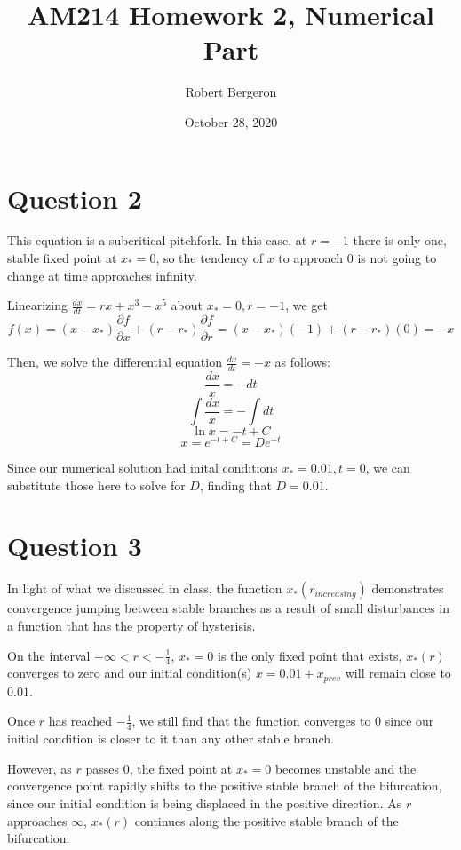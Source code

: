 \documentclass{article}
\title{AM214 Homework 2, Numerical Part}
\author{Robert Bergeron}
\date{October 28, 2020}
\begin{document}
\maketitle

\section*{Question 2}

This equation is a subcritical pitchfork. In this case, at \(r = -1\) there
is only one, stable fixed point at \(x_* = 0\), so the tendency of \(x\) to
approach \(0\) is not going to change at time approaches infinity.

Linearizing \(\frac{dx}{dt} = rx + x^3 - x^5\) about \(x_* = 0, r = -1\), we get
\[f(x) = (x - x_*)\frac{\partial f}{\partial x} + (r - r_*)\frac{\partial f}{\partial r}
= (x - x_*)(-1) + (r - r_*)(0) = -x\]

Then, we solve the differential equation \(\frac{dx}{dt} = -x\) as follows:
\[\frac{dx}{x} = -dt\]
\[\int \frac{dx}{x} = - \int dt\]
\[\ln x = -t + C\]
\[x = e^{-t + C} = De^{-t}\]

Since our numerical solution had inital conditions \(x_* = 0.01, t = 0\), we can
substitute those here to solve for \(D\), finding that \(D = 0.01\).

\section*{Question 3}
In light of what we discussed in class, the function \(x_*(r_{increasing})\)
demonstrates convergence jumping between stable branches as a result of small
disturbances in a function that has the property of hysterisis.

On the interval \(-\infty < r < -\frac{1}{4}\), \(x_* = 0\) is the only fixed point
that exists, \(x_*(r)\) converges to zero and our initial condition(s)
\(x = 0.01 + x_{prev}\) will remain close to \(0.01\).

Once \(r\) has reached \(-\frac{1}{4}\), we still find that the function converges
to \(0\) since our initial condition is closer to it than any other stable branch.

However, as \(r\) passes \(0\), the fixed point at \(x_* = 0\) becomes unstable and
the convergence point rapidly shifts to the positive
stable branch of the bifurcation, since our initial condition is being displaced in
the positive direction. As \(r\) approaches \(\infty\), \(x_*(r)\) continues along
the positive stable branch of the bifurcation.
\end{document}
